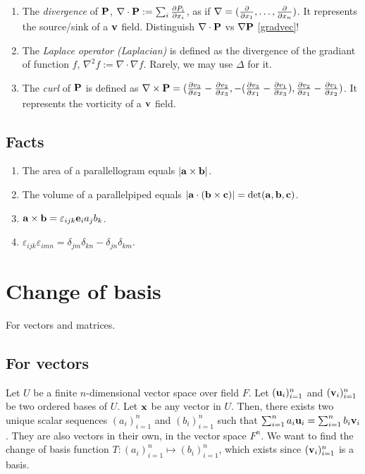 \documentclass[a4paper,twocolumn,enumboxcolor=cyan!50,10pt]{onepgnote}
\begin{document}
\begin{enumerate}
\item
	The \emph{divergence} of $\vb{P}$, $\nabla \cdot \vb{P} :=
	\sum_{i}\pdv{P_i}{x_i}$, as if $\nabla = (\pdv{}{x_1},\allowbreak
	\dots,\allowbreak \pdv{}{x_n})$. It represents the source/sink of a $\vb{v}$
	field.  \mynote Distinguish $\nabla \cdot \vb{P}$ vs $\nabla \vb{P}$
	\ref{gradvec}!
\item
	The \emph{Laplace operator (Laplacian)} is defined as the divergence of
	the gradiant of function $f$, $\nabla^2 f := \nabla \cdot \nabla f$.
	Rarely, we may use $\Delta$ for it.
\item 
	The \emph{curl} of $\vb{P}$ is defined as $\nabla \times \vb{P} =
	(\pdv{v_3}{x_2} - \pdv{v_2}{x_3}, -(\pdv{v_3}{x_1} - \pdv{v_1}{x_3}),
	\pdv{v_2}{x_1} - \pdv{v_1}{x_2})$. It represents the vorticity of a
	$\vb{v}$ field.
\end{enumerate}

\subsection{Facts}
\begin{enumerate}
\item
The area of a parallellogram equals $|\vb{a} \times \vb{b}|$. 
\item
	The volume of a
parallelpiped equals $|\vb{a} \cdot (\vb{b} \times \vb{c})| = \det(\vb{a},
\vb{b}, \vb{c})$.
\item 
	$\vb{a} \times \vb{b} =
	\varepsilon_{ijk}\vb{e}_ia_jb_k$.
\item 
	$\varepsilon_{ijk}\varepsilon_{imn} = \delta_{jm}\delta_{kn} -
	\delta_{jn}\delta_{km}$.
\end{enumerate}

\section{Change of basis}
For vectors and matrices.

\subsection{For vectors}
Let $U$ be a finite $n$-dimensional vector space over field $F$. Let
$(\vb{u}_i)_{i=1}^n$ and $(\vb{v}_i)_{i=1}^n$ be two ordered bases of $U$. Let
$\vb{x}$ be any vector in $U$. Then, there exists two unique
scalar sequences $(a_i)_{i=1}^n$ and $(b_i)_{i=1}^n$ such that $\sum_{i=1}^n
a_i\vb{u}_i = \sum_{i=1}^n b_i\vb{v}_i$. They are also vectors in their own, in
the vector space $F^n$. We want to find the change of basis function $T:
(a_i)_{i=1}^n \mapsto (b_i)_{i=1}^n$, which exists since $(\vb{v}_i)_{i=1}^n$ is
a basis.
\end{document}
